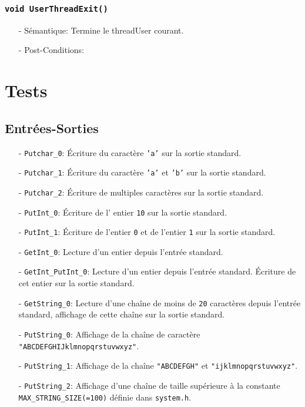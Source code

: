 \documentclass[11pt]{article}
\begin{document}
\subsubsection{\texttt{void UserThreadExit()}}
\begin{itemize}
\item[-] Sémantique: Termine le threadUser courant.
\item[-] Post-Conditions: 
\end{itemize}



\section{Tests}

\subsection{Entrées-Sorties}
\begin{itemize}
\item[-] \texttt{Putchar\_0}: Écriture du caractère \texttt{'a'} sur la sortie standard.
\item[-] \texttt{Putchar\_1}: Écriture du caractère \texttt{'a'} et \texttt{'b'} sur la sortie standard.
\item[-] \texttt{Putchar\_2}: Écriture de multiples caractères sur la sortie standard.
\item[-] \texttt{PutInt\_0}: Écriture de l' entier \texttt{10} sur la sortie standard.
\item[-] \texttt{PutInt\_1}: Écriture de l'entier \texttt{0} et de l'entier \texttt{1} sur la sortie standard.
\item[-] \texttt{GetInt\_0}: Lecture d'un entier depuis l'entrée standard.
\item[-] \texttt{GetInt\_PutInt\_0}:
  Lecture d'un entier depuis l'entrée standard.
  Écriture de cet entier sur la sortie standard.
\item[-] \texttt{GetString\_0}: Lecture d'une chaîne de moins de \texttt{20} caractères depuis l'entrée standard, affichage de cette chaîne sur la sortie standard.
\item[-] \texttt{PutString\_0}: Affichage de la chaîne de caractère \texttt{"ABCDEFGHIJklmnopqrstuvwxyz"}.
\item[-] \texttt{PutString\_1}: Affichage de la chaîne \texttt{"ABCDEFGH"} et \texttt{"ijklmnopqrstuvwxyz"}.
\item[-] \texttt{PutString\_2}:   Affichage d'une chaîne de taille supérieure à la
  constante \texttt{MAX\_STRING\_SIZE(=100)} définie dans \texttt{system.h}.
\end{itemize}
\end{document}
